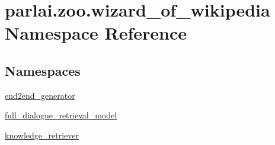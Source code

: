\hypertarget{namespaceparlai_1_1zoo_1_1wizard__of__wikipedia}{}\section{parlai.\+zoo.\+wizard\+\_\+of\+\_\+wikipedia Namespace Reference}
\label{namespaceparlai_1_1zoo_1_1wizard__of__wikipedia}
\subsection*{Namespaces}
\begin{DoxyCompactItemize}
\item 
 \hyperlink{namespaceparlai_1_1zoo_1_1wizard__of__wikipedia_1_1end2end__generator}{end2end\+\_\+generator}
\item 
 \hyperlink{namespaceparlai_1_1zoo_1_1wizard__of__wikipedia_1_1full__dialogue__retrieval__model}{full\+\_\+dialogue\+\_\+retrieval\+\_\+model}
\item 
 \hyperlink{namespaceparlai_1_1zoo_1_1wizard__of__wikipedia_1_1knowledge__retriever}{knowledge\+\_\+retriever}
\end{DoxyCompactItemize}
